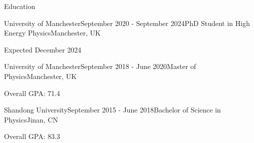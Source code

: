 \documentclass{resume} %
\begin{document}
    \begin{rSection}{Education}
        \begin{rSubsection}{University of Manchester}{September 2020 - September 2024}{PhD Student in High Energy Physics}{Manchester, UK}
            \item Expected December 2024 
        \end{rSubsection}
        \begin{rSubsection}{University of Manchester}{September 2018 - June 2020}{Master of Physics}{Manchester, UK}
            \item Overall GPA: 71.4
        \end{rSubsection}
        \begin{rSubsection}{Shandong University}{September 2015 - June 2018}{Bachelor of Science in Physics}{Jinan, CN}
            \item Overall GPA: 83.3
        \end{rSubsection}
    \end{rSection}
\end{document}
